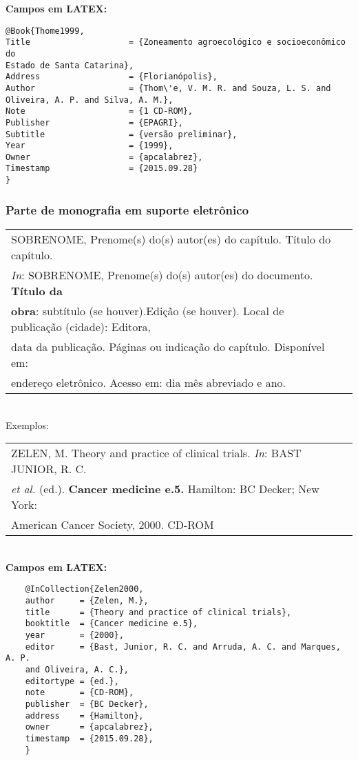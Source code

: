 \textbf{Campos em LATEX:} 

\begin{verbatim}
@Book{Thome1999,
Title                    = {Zoneamento agroecológico e socioeconômico do 
Estado de Santa Catarina},
Address                  = {Florianópolis},
Author                   = {Thom\'e, V. M. R. and Souza, L. S. and 
Oliveira, A. P. and Silva, A. M.},
Note                     = {1 CD-ROM},
Publisher                = {EPAGRI},
Subtitle                 = {versão preliminar},
Year                     = {1999},
Owner                    = {apcalabrez},
Timestamp                = {2015.09.28}
}
\end{verbatim}


 \subsubsection{Parte de monografia em suporte eletrônico}
	 
	 \begin{tabular}{|l|c|} \hline
	 	SOBRENOME, Prenome(s) do(s) autor(es) do capítulo. Título do capítulo. \\ \textit{In}:
	 	SOBRENOME, Prenome(s)  do(s) autor(es) do documento.  \textbf{Título da} \\ \textbf{obra}: subtítulo (se houver).Edição (se houver). Local de publicação (cidade): Editora, \\ data da publicação. P\'aginas ou indicação do capítulo. Disponível em: \\ endereço eletrônico. Acesso em: dia m\^es abreviado e ano.  \\\hline
	 \end{tabular} \\ 
	 
	 Exemplos: \\ 
	 
	 \begin{tabular}{|l|c|} \hline
		ZELEN, M. Theory and practice of clinical trials. \textit{In}: BAST JUNIOR, R. C. \\\textit{et al.} (ed.). \textbf{Cancer medicine e.5.} Hamilton: BC Decker; New York: \\American Cancer Society, 2000. CD-ROM  \\\hline
	\end{tabular} \\ 
	
	\textbf{Campos em LATEX:} 
	
	
	\begin{verbatim}
	@InCollection{Zelen2000,
	author     = {Zelen, M.},
	title      = {Theory and practice of clinical trials},
	booktitle  = {Cancer medicine e.5},
	year       = {2000},
	editor     = {Bast, Junior, R. C. and Arruda, A. C. and Marques, A. P. 
	and Oliveira, A. C.},
	editortype = {ed.},
	note       = {CD-ROM},
	publisher  = {BC Decker},
	address    = {Hamilton},
	owner      = {apcalabrez},
	timestamp  = {2015.09.28},
	}
	\end{verbatim}
		
